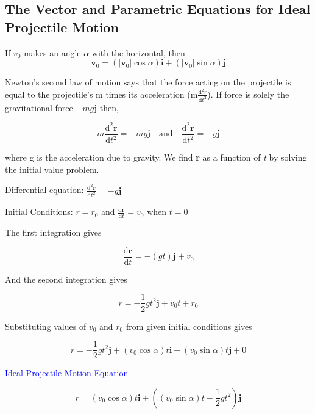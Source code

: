 \documentclass[12pt,a4paper]{article}
\newenvironment{mynote}{\vspace{1\baselineskip}\begin{note}}{\end{note}\vspace{1\baselineskip}}
\begin{document}
\subsection{The Vector and Parametric Equations for Ideal Projectile Motion}

If \(v_0\) makes an angle \(\alpha\) with the horizontal, then
\[\mathbf{v}_0 = (|\mathbf{v}_0|\cos\alpha)\mathbf{i} +(|\mathbf{v}_0|\sin\alpha)\mathbf{j} \]

Newton's second law of motion says that the force acting on the projectile is equal to the projectile's m times its acceleration (m\(\frac{\mathrm{d}^2r}{\mathrm{d}t^2}\)).
If force is solely the gravitational force \(-mg\mathbf{j}\) then,

\[m \frac{\mathrm{d}^2\mathbf{r}}{\mathrm{d}t^2} = -mg\mathbf{j} \quad \mathrm{and} \quad \frac{\mathrm{d}^2\mathbf{r}}{\mathrm{d}t^2} = -g\mathbf{j}\]


where g is the acceleration due to gravity. We find \textbf{r} as a function of \textit{t} by solving the initial value problem.

\begin{center}
  Differential equation: \(\frac{\mathrm{d}^2\mathbf{r}}{\mathrm{d}t^2} = -g\mathbf{j}\)
\end{center}

\begin{center}
  Initial Conditions: \(r = r_0\) and \(\frac{\mathrm{d}\mathbf{r}}{\mathrm{d}t}=v_0 \) when \(\mathit{t} = 0\)
\end{center}

The first integration gives

\[\frac{\mathrm{d}\mathbf{r}}{\mathrm{d}t} = -(gt)\mathbf{j} + v_0\]

And the second integration gives

\[r = -\frac{1}{2}gt^2\mathbf{j} + v_{0}t + r_0 \]

Substituting values of $v_0$ and $r_0$ from given initial conditions gives

\[r = -\frac{1}{2}gt^2\mathbf{j} + (v_0\cos\alpha)t\mathbf{i} + (v_0\sin\alpha)t\mathbf{j} + 0 \]


\begin{mynote}
  \textcolor{blue}{Ideal Projectile Motion Equation}

  \[r = (v_0\cos\alpha)t\mathbf{i} + \left((v_0\sin\alpha)t - \frac{1}{2}gt^2\right)\mathbf{j} \]


\end{mynote}
\end{document}
